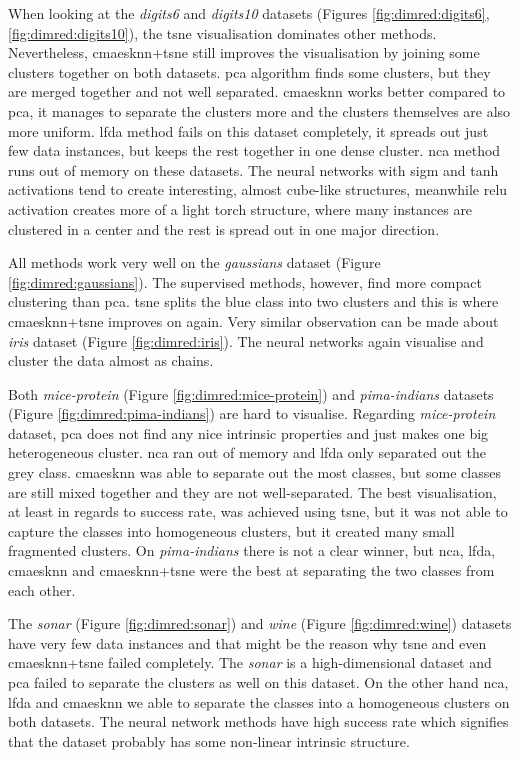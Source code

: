 \documentclass[12pt,a4paper]{report}
\begin{document}
When looking at the \textit{digits6} and \textit{digits10} datasets (Figures \ref{fig:dimred:digits6}, \ref{fig:dimred:digits10}), the \ac{tsne} visualisation dominates other methods. Nevertheless, \ac{cmaesknn}+\ac{tsne} still improves the visualisation by joining some clusters together on both datasets. \ac{pca} algorithm finds some clusters, but they are merged together and not well separated. \ac{cmaesknn} works better compared to \ac{pca}, it manages to separate the clusters more and the clusters themselves are also more uniform. \ac{lfda} method fails on this dataset completely, it spreads out just few data instances, but keeps the rest together in one dense cluster. \ac{nca} method runs out of memory on these datasets. The neural networks with \ac{sigm} and \ac{tanh} activations tend to create interesting, almost cube-like structures, meanwhile \ac{relu} activation creates more of a light torch structure, where many instances are clustered in a center and the rest is spread out in one major direction.

All methods work very well on the \textit{gaussians} dataset (Figure \ref{fig:dimred:gaussians}). The supervised methods, however, find more compact clustering than \ac{pca}. \ac{tsne} splits the blue class into two clusters and this is where \ac{cmaesknn}+\ac{tsne} improves on again. Very similar observation can be made about \textit{iris} dataset (Figure \ref{fig:dimred:iris}). The neural networks again visualise and cluster the data almost as chains.

Both \textit{mice-protein} (Figure \ref{fig:dimred:mice-protein}) and \textit{pima-indians} datasets (Figure \ref{fig:dimred:pima-indians}) are hard to visualise. Regarding \textit{mice-protein} dataset, \ac{pca} does not find any nice intrinsic properties and just makes one big heterogeneous cluster. \ac{nca} ran out of memory and \ac{lfda} only separated out the grey class. \ac{cmaesknn} was able to separate out the most classes, but some classes are still mixed together and they are not well-separated. The best visualisation, at least in regards to success rate, was achieved using \ac{tsne}, but it was not able to capture the classes into homogeneous clusters, but it created many small fragmented clusters. On \textit{pima-indians} there is not a clear winner, but \ac{nca}, \ac{lfda}, \ac{cmaesknn} and \ac{cmaesknn}+\ac{tsne} were the best at separating the two classes from each other.

The \textit{sonar} (Figure \ref{fig:dimred:sonar}) and \textit{wine} (Figure \ref{fig:dimred:wine}) datasets have very few data instances and that might be the reason why \ac{tsne} and even \ac{cmaesknn}+\ac{tsne} failed completely. The \textit{sonar} is a high-dimensional dataset and \ac{pca} failed to separate the clusters as well on this dataset. On the other hand \ac{nca}, \ac{lfda} and \ac{cmaesknn} we able to separate the classes into a homogeneous clusters on both datasets. The neural network methods have high success rate which signifies that the dataset probably has some non-linear intrinsic structure.
\end{document}

